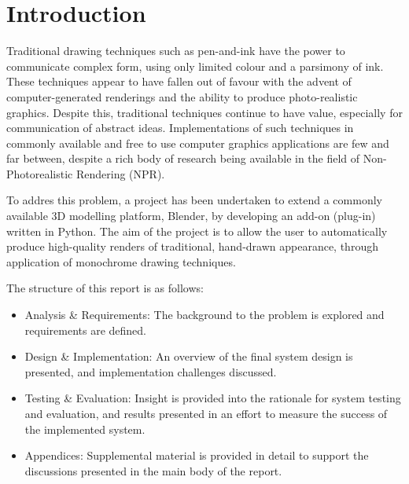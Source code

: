 

\chapter{Introduction}\label{intro}

Traditional drawing techniques such as pen-and-ink have the power to communicate complex form, using only limited colour and a parsimony of ink.
These techniques appear to have fallen out of favour with the advent of computer-generated renderings and the ability to produce photo-realistic graphics.
Despite this, traditional techniques continue to have value, especially for communication of abstract ideas.
Implementations of such techniques in commonly available and free to use computer graphics applications are few and far between, despite a rich body of research being available in the field of Non-Photorealistic Rendering (NPR).

To addres this problem, a project has been undertaken to extend a commonly available 3D modelling platform, Blender, by developing an add-on (plug-in) written in Python. The aim of the project is to allow the user to automatically produce high-quality renders of traditional, hand-drawn appearance, through application of monochrome drawing techniques.

The structure of this report is as follows:

\begin{itemize}
	\item{Analysis \& Requirements: The background to the problem is explored and requirements are defined.}
	\item{Design \& Implementation: An overview of the final system design is presented, and implementation challenges discussed.}
	\item{Testing \& Evaluation: Insight is provided into the rationale for system testing and evaluation, and results presented in an effort to measure the success of the implemented system.}
	\item{Appendices: Supplemental material is provided in detail to support the discussions presented in the main body of the report.}
\end{itemize}
